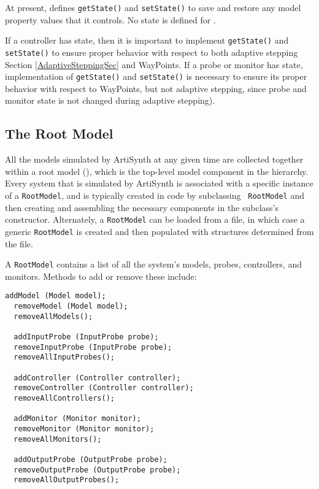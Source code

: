\documentclass{article}
\begin{document}
At present, 
defines {\tt getState()} and {\tt setState()} to save and restore any
model property values that it controls. No state is defined for
.

\begin{sideblock}
If a controller has state, then it is important to implement
{\tt getState()} and {\tt setState()} to ensure proper behavior with
respect to both
adaptive stepping Section \ref{AdaptiveSteppingSec} and WayPoints.
If a probe or monitor has state, implementation
of {\tt getState()} and {\tt setState()} is necessary
to ensure its proper behavior with respect to WayPoints,
but not adaptive stepping, since probe and
monitor state is not changed during adaptive stepping).
\end{sideblock}

\subsection{The Root Model}
\label{RootModelSec}

All the models simulated by ArtiSynth at any given time are collected
together within a root model
(), which is the
top-level model component in the hierarchy. Every system that is
simulated by ArtiSynth is associated with a specific instance of a
{\tt RootModel}, and is typically created in code by subclassing {\tt
RootModel} and then creating and assembling the necessary components
in the subclass's constructor. Alternately, a {\tt RootModel} can be
loaded from a file, in which case a generic {\tt RootModel} is created
and then populated with structures determined from the file.

A {\tt RootModel} contains a list of all the system's models, probes,
controllers, and monitors. Methods to add or remove these include:

\begin{lstlisting}[]
  addModel (Model model);
  removeModel (Model model);
  removeAllModels();

  addInputProbe (InputProbe probe);
  removeInputProbe (InputProbe probe);
  removeAllInputProbes();

  addController (Controller controller);
  removeController (Controller controller);
  removeAllControllers();

  addMonitor (Monitor monitor);
  removeMonitor (Monitor monitor);
  removeAllMonitors();

  addOutputProbe (OutputProbe probe);
  removeOutputProbe (OutputProbe probe);
  removeAllOutputProbes();
\end{lstlisting}
\end{document}

